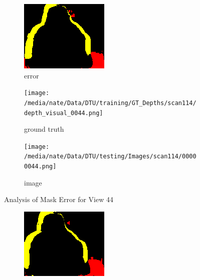 \documentclass{article}
\begin{document}
\begin{figure}
\begin{subfigure}{0.3\textwidth}
		\includegraphics[width=\textwidth]{./output/044_error.png}
		\caption{error}
		\label{fig:error44}
	\end{subfigure}
	\hfill
	\centering
	\begin{subfigure}{0.3\textwidth}
		\centering
		\texttt{[image: /media/nate/Data/DTU/training/GT\_Depths/scan114/depth\_visual\_0044.png]}
		\caption{ground truth}
		\label{fig:gt44}
	\end{subfigure}
	\hfill
	\centering
	\begin{subfigure}{0.3\textwidth}
		\centering
		\texttt{[image: /media/nate/Data/DTU/testing/Images/scan114/00000044.png]}
		\caption{image}
		\label{fig:img44}
	\end{subfigure}
	\hfill
	\caption{Analysis of Mask Error for View 44}
	\label{fig:error_analys44}
\end{figure}\begin{figure}
	\centering
	\begin{subfigure}{0.3\textwidth}
		\centering
		\includegraphics[width=\textwidth]{./output/045_error.png}

\end{subfigure}
\end{figure}
\end{document}
